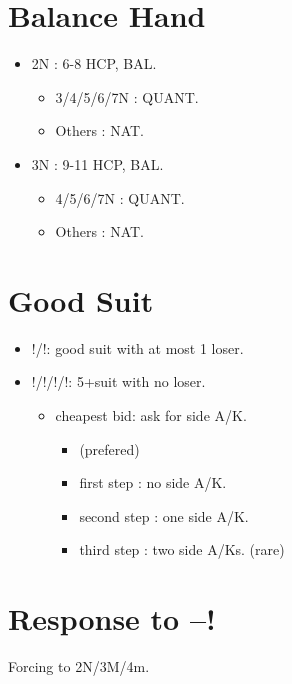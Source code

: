 \documentclass[12pt,twoside,a5paper]{report}%
\begin{document}
	\section*{Balance Hand}
		\begin{itemize}
		\renewcommand{\labelitemi}{}
			\item 2N : 6-8 HCP, BAL.
				\begin{itemize}
				\renewcommand{\labelitemi}{--}
					\item 3/4/5/6/7N : QUANT.
					\item Others : NAT.
				\end{itemize}
			\item 3N : 9-11 HCP, BAL.
				\begin{itemize}
				\renewcommand{\labelitemi}{--}
					\item 4/5/6/7N : QUANT.
					\item Others : NAT.
				\end{itemize}
		\end{itemize}

	\section*{Good Suit}
		\begin{itemize}
		\renewcommand{\labelitemi}{}
			\item {}!/\sp{}!: good suit with at most 1 loser.
			\item {}!/\di{}!/\he{}!/\sp{}!: 5+suit with no loser.
			\begin{itemize}
			\renewcommand{\labelitemi}{--}
			\item cheapest bid: ask for side A/K.
				\begin{itemize}
				\renewcommand{\labelitemi}{--}
					\item (prefered)
					\item first step : no side A/K.
					\item second step : one side A/K.
					\item third step : two side A/Ks. (rare)			
				\end{itemize}
			\end{itemize}
		\end{itemize}

	\section*{Response to --!}
	Forcing to 2N/3M/4m.
\end{document}
